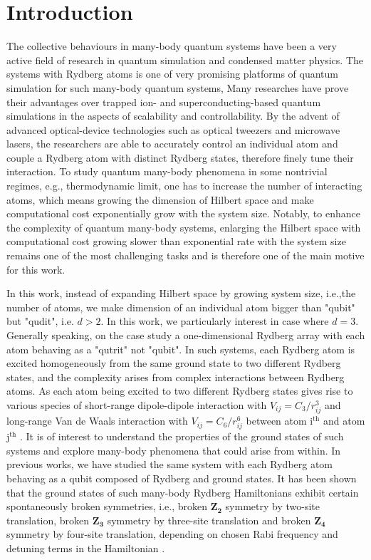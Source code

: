 \documentclass[%
 reprint,
nofootinbib,
 amsmath,amssymb,
 aps,
floatfix,
]{revtex4-2}
\begin{document}
\section{Introduction}
The collective behaviours in many-body quantum systems have been a very active field of research in quantum simulation and condensed matter physics. The systems with Rydberg atoms is one of very promising platforms of quantum simulation for such many-body quantum systems, Many researches have prove their advantages over trapped ion- and superconducting-based quantum simulations in the aspects of scalability and controllability. By the advent of advanced optical-device technologies such as optical tweezers and microwave lasers, the researchers are able to accurately control an individual atom and couple a Rydberg atom with distinct Rydberg states, therefore finely tune their interaction. To study quantum many-body phenomena in some nontrivial regimes, e.g., thermodynamic limit, one has to increase the number of interacting atoms, which means growing the dimension of Hilbert space and make computational cost exponentially grow with the system size. Notably, to enhance the complexity of quantum many-body systems, enlarging the Hilbert space with computational cost growing slower than exponential rate with the system size remains one of the most challenging tasks and is therefore one of the main motive for this work.

In this work, instead of expanding Hilbert space by growing system size, i.e.,the number of atoms, we make dimension of an individual atom bigger than "qubit" but "qudit", i.e. $d>2$. In this work, we particularly interest in case where $d=3$. Generally speaking, on the case study a one-dimensional Rydberg array with each atom behaving as a "qutrit" not "qubit". In such systems, each Rydberg atom is excited homogeneously from the same ground state to two different Rydberg states, and the complexity arises from complex interactions between Rydberg atoms. As each atom being excited to two different Rydberg states gives rise to various species of short-range dipole-dipole interaction with $V_{ij} = C_3/r^3_{ij}$  and long-range Van de Waals interaction with $V_{ij} = C_6/r^6_{ij}$ between atom $\text{i}^{\text{th}}$ and atom $\text{j}^{\text{th}}$ \cite{Saffman2010QuantumAtoms}. It is of interest to understand the properties of the ground states of such systems and explore many-body phenomena that could arise from within. In previous works, we have studied the same system with each Rydberg atom behaving as a qubit composed of Rydberg and ground states. It has been shown that the ground states of such many-body Rydberg Hamiltonians exhibit certain spontaneously broken symmetries, i.e., broken $\mathbf{Z_2}$ symmetry by two-site translation, broken $\mathbf{Z_3}$ symmetry by three-site translation and broken $\mathbf{Z_4}$ symmetry by four-site translation, depending on chosen Rabi frequency and detuning terms in the Hamiltonian \cite{Bernien2017ProbingSimulator,Keesling2019QuantumSimulator}. 
\end{document}
